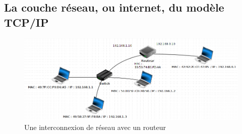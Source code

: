 \documentclass[
  11pt,
]{article}
\begin{document}
\hypertarget{la-couche-ruxe9seau-ou-internet-du-moduxe8le-tcpip}{%
\subsection{La couche réseau, ou internet, du modèle
TCP/IP}\label{la-couche-ruxe9seau-ou-internet-du-moduxe8le-tcpip}}

\begin{figure}
\centering
\includegraphics{images/wlan1.png}
\caption{Une interconnexion de réseau avec un routeur}
\end{figure}
\end{document}
